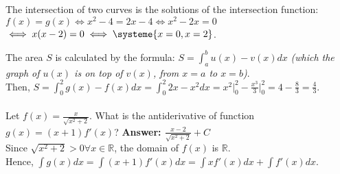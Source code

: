 \documentclass{article}
\begin{document}
    The intersection of two curves is the solutions of the intersection function:\\

    $\displaystyle f(x) = g(x) \iff x^2 - 4 = 2x - 4 \iff x^2 - 2x = 0$\\

    $\iff x(x - 2) = 0 \iff \systeme{x = 0, x = 2}$.

    The area $S$ is calculated by the formula: $\displaystyle S = \int_{a}^{b} u(x) - v(x) dx$ \textit{(which the graph of $u(x)$ is on top of $v(x)$, from $x = a$ to $x = b$)}.\\

    Then, $\displaystyle S = \int_{0}^{2} g(x) - f(x) dx = \int_{0}^{2} 2x - x^2 dx = x^2\big|_{0}^{2} - \frac{x^3}{3}\big|_{0}^{2} = 4 - \frac{8}{3} = \frac{4}{3}$.

    \paragraph{\cite{42@109}} Let $\displaystyle f(x) = \frac{x}{\sqrt{x^2 + 2}}$. What is the antiderivative of function $\displaystyle g(x) = (x + 1)f'(x)$? \textbf{Answer: $\displaystyle \frac{x - 2}{\sqrt{x^2 + 2}} + C$}\\

    Since $\displaystyle \sqrt{x^2 + 2} > 0 \forall x \in \mathbb{R}$, the domain of $f(x)$ is $\mathbb{R}$.\\

    Hence, $\displaystyle \int g(x) dx = \int (x + 1)f'(x) dx = \int xf'(x) dx + \int f'(x) dx$.\\
\end{document}
